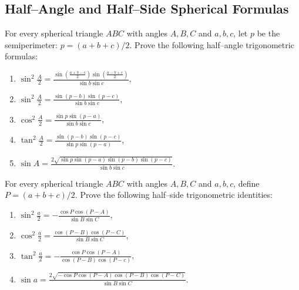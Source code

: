\documentclass[12pt,a4paper]{memoir}
\theoremstyle{definition}
\begin{document}
\subsection{Half--Angle and Half--Side Spherical Formulas}
	\begin{question}
		For every spherical triangle $ABC$ with angles $A,B,C$ and $a,b,c$, let $p$ be the semiperimeter: $p=(a+b+c)/2$. Prove the following half--angle trigonometric formulas:
		\begin{enumerate}
			\item $\displaystyle \sin^2\frac{A}{2} = \frac{\sin\left(\frac{a+b-c}{2}\right)\sin\left(\frac{a-b+c}{2}\right)}{\sin b \sin c}$,
			\item $\displaystyle \sin^2\frac{A}{2} = \frac{\sin(p-b)\sin(p-c)}{\sin b \sin c}$,
			\item $\displaystyle \cos^2\frac{A}{2} = \frac{\sin p\sin(p-a)}{\sin b \sin c}$,
			\item $\displaystyle \tan^2\frac{A}{2} = \frac{\sin(p-b)\sin(p-c)}{\sin p\sin(p-a)}$,
			\item $\displaystyle \sin A = \frac{2\sqrt{\sin p \sin(p-a)\sin(p-b)\sin(p-c)}}{\sin b \sin c}$.
		\end{enumerate}
	\end{question}
	\begin{question}
		For every spherical triangle $ABC$ with angles $A,B,C$ and $a,b,c$, define $P=(a+b+c)/2$. Prove the following half--side trigonometric identities:
		\begin{enumerate}
			\item $\displaystyle \sin^2\frac{a}{2} = -\frac{\cos P\cos(P-A)}{\sin B \sin C}$,
			\item $\displaystyle \cos^2\frac{a}{2} = \frac{\cos(P-B)\cos(P-C)}{\sin B \sin C}$,
			\item $\displaystyle \tan^2\frac{a}{2} = -\frac{\cos P \cos(P-A)}{\cos(P-B)\cos(P-c)}$,
			\item $\displaystyle \sin a = \frac{2\sqrt{-\cos P \cos(P-A)\cos(P-B)\cos(P-C)}}{\sin B \sin C}$.
		\end{enumerate}
	\end{question}
\end{document}

